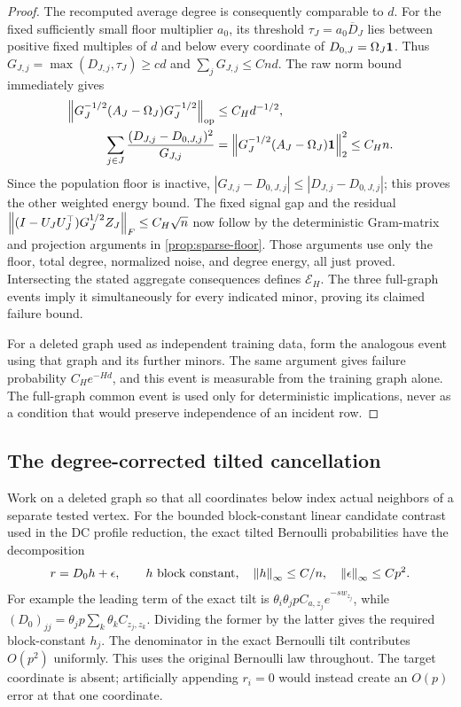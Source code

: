 \begin{proof}
The recomputed average degree is consequently comparable to $d$.
For the fixed sufficiently small floor multiplier $a_0$, its threshold
$\tau_J=a_0\overline D_J$ lies between positive fixed multiples of
$d$ and below every coordinate of $D_{0,J}=\Omega_J\mathbf 1$.
Thus $G_{J,j}=\max(D_{J,j},\tau_J)\ge cd$ and
$\sum_jG_{J,j}\le Cnd$. The raw norm bound immediately gives
\begin{align*}
 \left\lVert G_J^{-1/2}(A_J-\Omega_J)G_J^{-1/2}\right\rVert_{\mathrm{op}}
   &\le C_Hd^{-1/2},\\
 \sum_{j\in J}\frac{(D_{J,j}-D_{0,J,j})^2}{G_{J,j}}
   &=\left\lVert G_J^{-1/2}(A_J-\Omega_J)\mathbf 1\right\rVert_2^2
     \le C_Hn.
\end{align*}
Since the population floor is inactive,
$|G_{J,j}-D_{0,J,j}|\le|D_{J,j}-D_{0,J,j}|$; this proves the
other weighted energy bound. The fixed signal gap and the residual
$\left\lVert(I-U_JU_J^\top)G_J^{1/2}Z_J\right\rVert_F\le C_H\sqrt n$
now follow by the deterministic Gram-matrix and projection arguments
in \cref{prop:sparse-floor}. Those arguments use only the floor,
total degree, normalized noise, and degree energy, all just proved.
Intersecting the stated aggregate consequences defines
$\mathcal E_H$. The three full-graph events imply it simultaneously
for every indicated minor, proving its claimed failure bound.

For a deleted graph used as independent training data, form the
analogous event using that graph and its further minors. The same
argument gives failure probability $C_He^{-Hd}$, and this event is
measurable from the training graph alone. The full-graph common event
is used only for deterministic implications, never as a condition
that would preserve independence of an incident row.
\end{proof}


\subsection{The degree-corrected tilted cancellation}

Work on a deleted graph so that all coordinates below index actual
neighbors of a separate tested vertex. For the bounded block-constant
linear candidate contrast used in the DC profile reduction,
the exact tilted Bernoulli probabilities have the decomposition
\begin{equation}\label{eq:floor-tilt-decomposition}
 r=D_0h+\epsilon,\qquad
 h\text{ block constant},\quad
 \left\lVert h\right\rVert_\infty\le C/n,\quad \left\lVert\epsilon\right\rVert_\infty\le Cp^2.
\end{equation}
For example the leading term of the exact tilt is
$\theta_i\theta_jpC_{a,z_j}e^{-s w_{z_j}}$, while
$(D_0)_{jj}=\theta_jp\sum_k\theta_k C_{z_j,z_k}$.
Dividing the former by the latter gives the required block-constant
$h_j$. The denominator in the exact Bernoulli tilt contributes
$O(p^2)$ uniformly. This uses the original Bernoulli law throughout.
The target coordinate is absent; artificially appending $r_i=0$ would
instead create an $O(p)$ error at that one coordinate.

